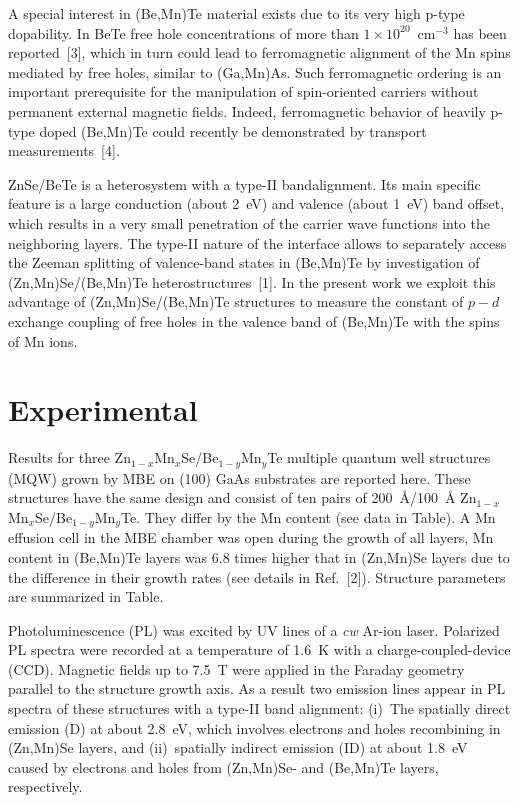 \documentclass[a4paper,draft]{book}
\begin{document}
A special interest in (Be,Mn)Te material exists due to its very high p-type
dopability.
In BeTe free hole concentrations of more than $1\times 10^{20}$~cm$^{-3}$
has been reported~[3], which in turn could lead to
ferromagnetic alignment of the Mn spins mediated by free holes, similar to
(Ga,Mn)As.
Such ferromagnetic ordering is an important prerequisite for the
manipulation of spin-oriented carriers without permanent external magnetic
fields.
Indeed, ferromagnetic behavior of heavily p-type doped (Be,Mn)Te
could recently be demonstrated by transport measurements~[4].

ZnSe/BeTe is a heterosystem with a type-II band\linebreak alignment.
Its main specific feature is a large conduction (about 2~eV) and valence (about 1~eV) band
offset, which results in a very small penetration of the carrier wave
functions into the neighboring layers.
The type-II nature of the interface allows to separately access the Zeeman splitting of valence-band states in
(Be,Mn)Te by investigation of (Zn,Mn)Se/(Be,Mn)Te heterostructures~[1].
In the present work we exploit this advantage of (Zn,Mn)Se/(Be,Mn)Te structures
to measure the constant of $p{-}d$ exchange coupling of free holes in the valence
band of (Be,Mn)Te with the spins of Mn ions.

\section {Experimental}

Results for three Zn$_{1-x}$Mn$_{x}$Se/Be$_{1-y}$Mn$_{y}$Te multiple\linebreak
quantum well structures (MQW) grown by MBE on (100) GaAs substrates are
reported here.
These structures have the same design and consist of ten
pairs of 200~{\AA}/100~{\AA} Zn$_{1-x}$Mn$_{x}$Se/Be$_{1-y}$Mn$_{y}$Te.
They differ by the Mn content (see data in Table).
A Mn effusion cell in the MBE chamber was open during the growth of all layers, Mn content in
(Be,Mn)Te layers was 6.8 times higher that in (Zn,Mn)Se layers due to the
difference in their growth rates (see details in Ref.~[2]).
Structure parameters are summarized in Table.

Photoluminescence (PL) was excited by UV lines of a {\it cw} Ar-ion laser.
Polarized PL spectra were recorded at a temperature of 1.6~K with a
charge-coupled-device (CCD).
Magnetic fields up to 7.5~T were applied in the
Faraday geometry parallel to the structure growth axis.
As a result two emission lines appear in PL spectra of these structures with a type-II band
alignment:
(i)~The spatially direct emission (D) at about 2.8~eV, which
involves electrons and holes recombining in (Zn,Mn)Se layers, and
(ii)~spatially indirect emission (ID) at about 1.8~eV caused by electrons and
holes from (Zn,Mn)Se- and (Be,Mn)Te layers, respectively.
\end{document}
